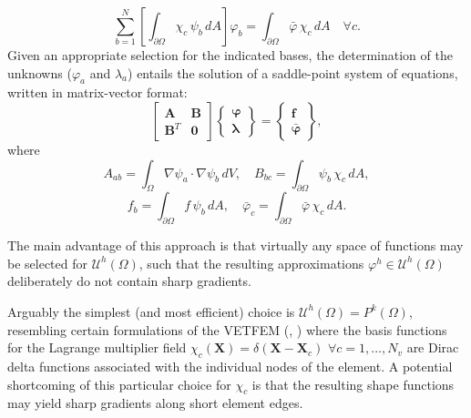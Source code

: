 \begin{equation}
	\sum_{b=1}^N \left[ \int_{\partial \Omega} \chi_c \, \psi_b \, dA \right] \varphi_b = \int_{\partial \Omega} \bar{\varphi} \, \chi_c \, dA \quad \forall c.
\end{equation}
Given an appropriate selection for the indicated bases, the determination of the unknowns ($\varphi_a$ and $\lambda_a$) entails the solution of a saddle-point system of equations, written in matrix-vector format:
\begin{equation}
	\left[ \begin{array}{cc} \mathbf{A} & \mathbf{B} \\ \mathbf{B}^T & \mathbf{0} \end{array} \right] \left\{ \begin{array}{c} \boldsymbol{\varphi} \\ \boldsymbol{\lambda} \end{array} \right\} = \left\{ \begin{array}{c} \mathbf{f} \\ \bar{\boldsymbol{\varphi}} \end{array} \right\},
\end{equation}
where
\begin{equation}
	A_{ab} = \int_{\Omega} \nabla \psi_a \cdot \nabla \psi_b \, dV, \quad B_{bc} = \int_{\partial \Omega} \psi_b \, \chi_c \, dA,
\end{equation}
\begin{equation}
	f_{b} = \int_{\partial \Omega} f \, \psi_b \, dA, \quad \bar{\varphi}_{c} = \int_{\partial \Omega} \bar{\varphi} \, \chi_c \, dA.
\end{equation}

	The main advantage of this approach is that virtually any space of functions may be selected for $\mathcal{U}^h (\Omega)$, such that the resulting approximations $\varphi^h \in \mathcal{U}^h (\Omega)$ deliberately do not contain sharp gradients.
	
	Arguably the simplest (and most efficient) choice is $\mathcal{U}^h (\Omega) = P^{k} (\Omega)$, resembling certain formulations of the VETFEM (\cite{Rashid:00}, \cite{Rashid:06}) where the basis functions for the Lagrange multiplier field $\chi_c (\mathbf{X}) = \delta (\mathbf{X} - \mathbf{X}_c) \, \, \forall c = 1, \ldots, N_v$ are Dirac delta functions associated with the individual nodes of the element. A potential shortcoming of this particular choice for $\chi_c$ is that the resulting shape functions may yield sharp gradients along short element edges.
	
